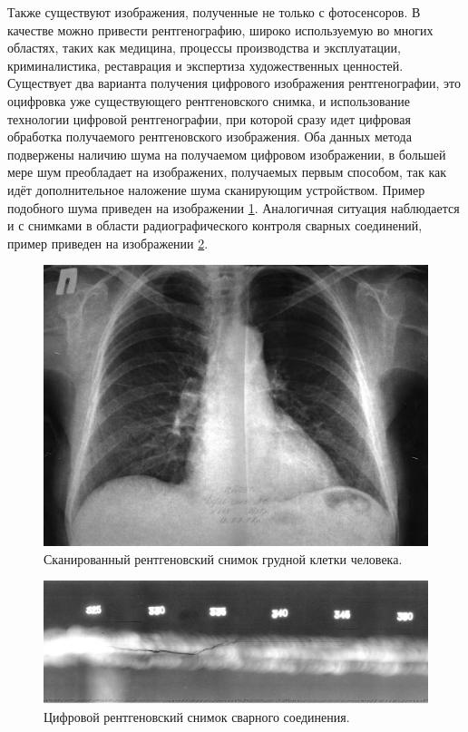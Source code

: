 \documentclass[14pt]{mmcs_article}
\begin{document}
Также существуют изображения, полученные не только с фотосенсоров. В качестве можно привести рентгенографию, широко используемую во многих областях, таких как медицина, процессы производства и эксплуатации, криминалистика, реставрация и экспертиза художественных ценностей. Существует два варианта получения цифрового изображения рентгенографии, это оцифровка уже существующего рентгеновского снимка, и использование технологии цифровой рентгенографии, при которой сразу идет цифровая обработка получаемого рентгеновского изображения. Оба данных метода подвержены наличию шума на получаемом цифровом изображении, в большей мере шум преобладает на изображених, получаемых первым способом, так как идёт дополнительное наложение шума сканирующим устройством. Пример подобного шума приведен на изображении \ref{fig:reng_scan}. Аналогичная ситуация наблюдается и с снимками в области радиографического контроля сварных соединений, пример приведен на изображении \ref{fig:reg_met_scan}.

\begin{figure}[h]
	\centering
	\includegraphics[width=\textwidth]{img/reng_scan}
	\caption{Сканированный рентгеновский снимок грудной клетки человека.}
	\label{fig:reng_scan}
\end{figure}

\begin{figure}[h]
	\centering
	\includegraphics[width=\textwidth]{img/reng_met_scan}
	\caption{Цифровой рентгеновский снимок сварного соединения.}
	\label{fig:reg_met_scan}
\end{figure}
\end{document}
